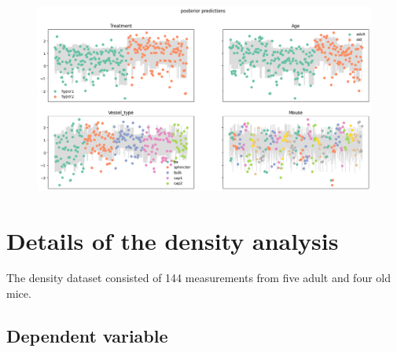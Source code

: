 \documentclass[
  letterpaper,
  DIV=11,
  numbers=noendperiod,
  oneside]{scrartcl}
\theoremstyle{plain}
\theoremstyle{remark}
\begin{document}
\begin{figure}


\caption{\label{fig-hypertension-predictions}\includegraphics{../plots/hypertension-posterior-predictive.png}}

\end{figure}%

\section{Details of the density
analysis}\label{details-of-the-density-analysis}

The density dataset consisted of 144 measurements from five adult and
four old mice.

\subsection{Dependent variable}\label{dependent-variable-4}
\end{document}
